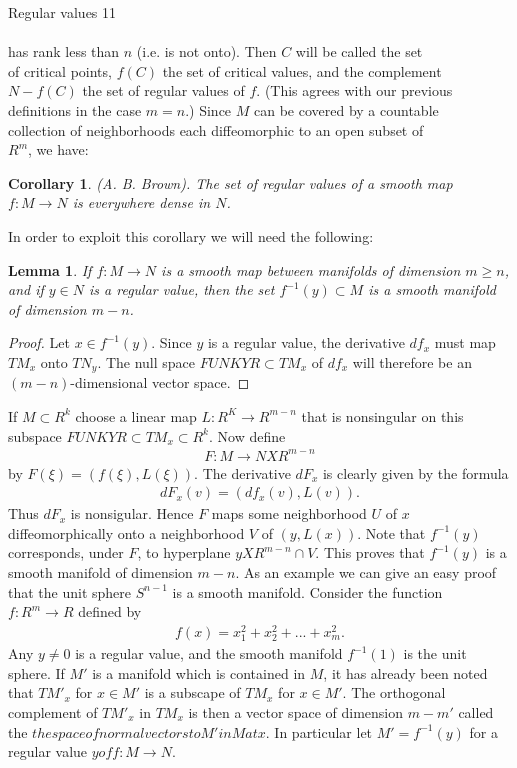 \documentclass[12pt, openany, closeany]{book}
\newtheorem{lemma}{Lemma}
\theoremstyle{corollary}
\newtheorem*{corollary}{Corollary}
\begin{document}
  \newpage
  Regular values \hfill 11 \\ \\
  has rank less than $n$ (i.e. is not onto). Then $C$ will be called the set \\
  of critical points, $f(C)$ the set of critical values, and the complement \\
  $N - f(C)$ the set of regular values of $f$. (This agrees with our previous \\
  definitions in the case $m = n$.) Since $M$ can be covered by a countable \\
  collection of neighborhoods each diffeomorphic to an open subset of \\
  $R^m$, we have:
  \begin{corollary}
  (A. B. Brown). The set of regular values of a smooth map $f: M\to N$ is everywhere dense in $N$.
  \end{corollary}
  In order to exploit this corollary we will need the following:
  \begin{lemma}
  If $f: M \to N$ is a smooth map between manifolds of dimension $m\geq n$, and if $y\in N$ is a regular value, then the set $f^{-1}(y) \subset M$ is a smooth manifold of dimension $m - n$.
  \end{lemma}
  \begin{proof} Let $x\in f^{-1}(y)$. Since $y$ is a regular value, the derivative $df_{x}$ must map $TM_{x}$ onto $TN_{y}$. The null space $FUNKYR\subset TM_{x}$ of $df_{x}$ will therefore be an $(m - n)$-dimensional vector space.
  \end{proof} 
    If $M \subset R^{k}$ choose a linear map $L : R^K \to R^{m-n}$ that is nonsingular on this subspace $FUNKYR \subset TM_{x} \subset R^k$. Now define
    \begin{align*}
    F : M \to N X R^{m-n}
    \end{align*}
    by $F(\xi) = (f(\xi), L(\xi))$. The derivative $dF_{x}$ is clearly given by the formula
    \begin{align*}
      dF_{x}(v) = (df_{x}(v), L(v)).
    \end{align*}
    Thus $dF_{x}$ is nonsigular. Hence $F$ maps some neighborhood $U$ of $x$ diffeomorphically onto a neighborhood $V$ of $(y, L(x))$. Note that $f^{-1}(y)$ corresponds, under $F$, to hyperplane $y X R^{m-n}\cap V$. This proves that $f^{-1}(y)$ is a smooth manifold of dimension $m - n$. 
    As an example we can give an easy proof that the unit sphere $S^{n-1}$ is a smooth manifold. Consider the function $f : R^m \to R$ defined by
    \begin{align*}
      f(x) = x^2_{1} + x^2_{2} + ... + x^2_{m}.
    \end{align*}
    Any $y \neq 0$ is a regular value, and the smooth manifold $f^{-1}(1)$ is the unit sphere.
    If $M'$ is a manifold which is contained in $M$, it has already been noted that $TM'_{x}$ for $x\in M'$ is a subscape of $TM_{x}$ for $x\in M'$. The orthogonal complement of $TM'_{x}$ in $TM_{x}$ is then a vector space of dimension $m - m'$ called the $the space of normal vectors to M' in M at x$.
    In particular let $M' = f^{-1}(y)$ for a regular value $y of f: M \to N$.
\end{document}
